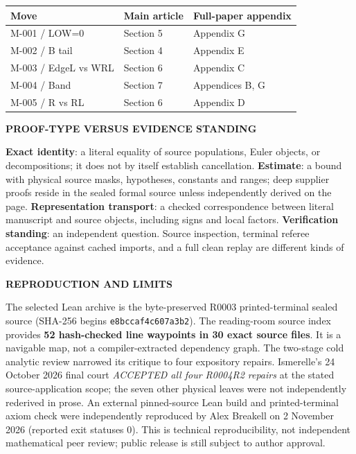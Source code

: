\documentclass[11pt,letterpaper]{article}
\newcommand{\kicker}[1]{{\sffamily\small\bfseries\color{pine}\MakeUppercase{#1}}}
\begin{document}
\begin{tabularx}{\linewidth}{@{}p{1.22in}p{1.48in}X@{}}
\toprule
\sffamily\small Move & \sffamily\small Main article & \sffamily\small Full-paper appendix\\
\midrule
M-001 / LOW=0 & Section 5 & Appendix G\\[5pt]
M-002 / B tail & Section 4 & Appendix E\\[5pt]
M-003 / EdgeL vs WRL & Section 6 & Appendix C\\[5pt]
M-004 / Band & Section 7 & Appendices B, G\\[5pt]
M-005 / R vs RL & Section 6 & Appendix D\\
\bottomrule
\end{tabularx}

\vspace{12pt}
\kicker{Proof-type versus evidence standing}\par
\textbf{Exact identity}: a literal equality of source populations, Euler
objects, or decompositions; it does not by itself establish cancellation.
\textbf{Estimate}: a bound with physical source masks, hypotheses,
constants and ranges; deep supplier proofs reside in the sealed formal
source unless independently derived on the page.
\textbf{Representation transport}: a checked correspondence between
literal manuscript and source objects, including signs and local factors.
\textbf{Verification standing}: an independent question. Source inspection,
terminal referee acceptance against cached imports, and a full clean
replay are different kinds of evidence.

\begin{quietbox}
\kicker{Reproduction and limits}\par
The selected Lean archive is the byte-preserved R0003 printed-terminal
sealed source (SHA-256 begins \texttt{e8bccaf4c607a3b2}).
The reading-room source index provides \textbf{52 hash-checked line
waypoints in 30 exact source files}. It is a navigable map, not a
compiler-extracted dependency graph. The two-stage cold analytic review
narrowed its critique to four expository repairs. Ismerelle's 24 October
2026 final court \emph{ACCEPTED all four R0004R2 repairs} at the stated
source-application scope; the seven other physical leaves were not
independently rederived in prose. An external pinned-source Lean build and printed-terminal axiom
check were independently reproduced by Alex Breakell on 2 November
2026 (reported exit statuses 0). This is technical reproducibility,
not independent mathematical peer review; public release is still
subject to author approval.
\end{quietbox}
\end{document}
